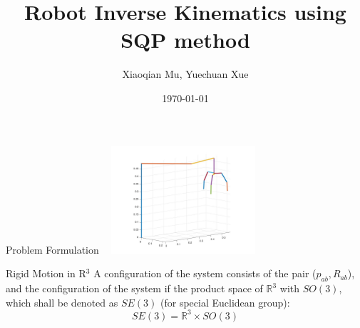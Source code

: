 \documentclass[10pt, compress]{beamer}
\title{Robot Inverse Kinematics using SQP method}
\subtitle{}
\date{\today}
\author{Xiaoqian Mu, Yuechuan Xue}
\institute{Iowa State University}
\begin{document}
\maketitle

\begin{frame}[fragile]{Problem Formulation}
\includegraphics[width=6cm, height=4cm]{robot-matlab-config.jpg}
\end{frame}


\begin{frame}[fragile]{Rigid Motion in R$^3$}
A configuration of the system consists of the pair ($p_{ab}, R_{ab}$), and the configuration of the system if the product space of $\mathbb{R}^3$ with $SO(3)$, which shall be denoted as $SE(3)$ (for special Euclidean group):
$$SE(3) = \mathbb{R}^3 \times SO(3)$$
\end{frame}
\end{document}
